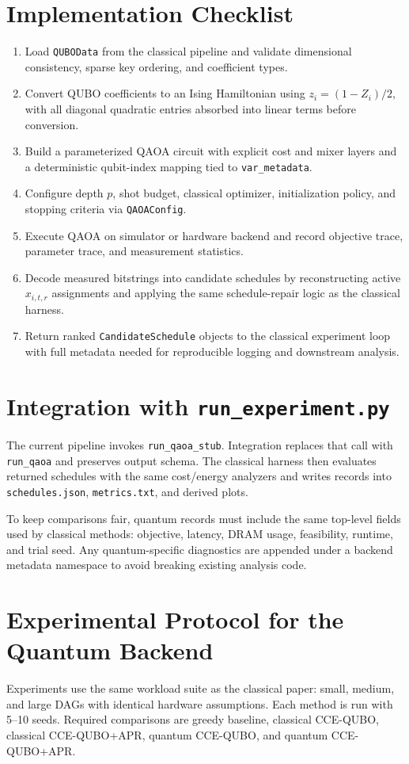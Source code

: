 \documentclass{article}
\begin{document}
\section{Implementation Checklist}
\begin{enumerate}
\item Load \texttt{QUBOData} from the classical pipeline and validate dimensional consistency, sparse key ordering, and coefficient types.
\item Convert QUBO coefficients to an Ising Hamiltonian using $z_i=(1-Z_i)/2$, with all diagonal quadratic entries absorbed into linear terms before conversion.
\item Build a parameterized QAOA circuit with explicit cost and mixer layers and a deterministic qubit-index mapping tied to \texttt{var\_metadata}.
\item Configure depth $p$, shot budget, classical optimizer, initialization policy, and stopping criteria via \texttt{QAOAConfig}.
\item Execute QAOA on simulator or hardware backend and record objective trace, parameter trace, and measurement statistics.
\item Decode measured bitstrings into candidate schedules by reconstructing active $x_{i,t,r}$ assignments and applying the same schedule-repair logic as the classical harness.
\item Return ranked \texttt{CandidateSchedule} objects to the classical experiment loop with full metadata needed for reproducible logging and downstream analysis.
\end{enumerate}

\section{Integration with \texttt{run\_experiment.py}}
The current pipeline invokes \texttt{run\_qaoa\_stub}. Integration replaces that call with \texttt{run\_qaoa} and preserves output schema. The classical harness then evaluates returned schedules with the same cost/energy analyzers and writes records into \texttt{schedules.json}, \texttt{metrics.txt}, and derived plots.

To keep comparisons fair, quantum records must include the same top-level fields used by classical methods: objective, latency, DRAM usage, feasibility, runtime, and trial seed. Any quantum-specific diagnostics are appended under a backend metadata namespace to avoid breaking existing analysis code.

\section{Experimental Protocol for the Quantum Backend}
Experiments use the same workload suite as the classical paper: small, medium, and large DAGs with identical hardware assumptions. Each method is run with 5--10 seeds. Required comparisons are greedy baseline, classical CCE-QUBO, classical CCE-QUBO+APR, quantum CCE-QUBO, and quantum CCE-QUBO+APR.
\end{document}
